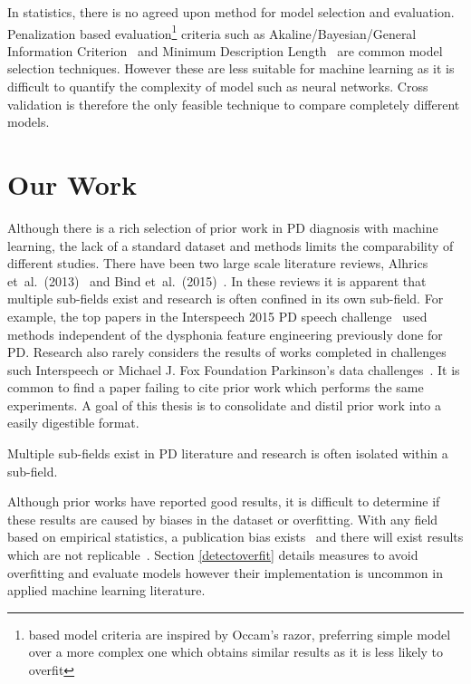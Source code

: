 \documentclass[12pt, twoside]{book}
\renewcommand\emph[1]{\textit{\color{USred}{#1}}}
\begin{document}
In statistics, there is no agreed upon method for model selection and evaluation. Penalization based evaluation\footnote{\emph{Penalization} based model criteria are inspired by Occam's razor, preferring simple model over a more complex one which obtains similar results as it is less likely to overfit}  criteria such as Akaline/Bayesian/General Information Criterion~\cite{aicbic,generalinfocriteriongic} and Minimum Description Length~\cite{mindescriptionlength} are common model selection techniques. However these are less suitable for machine learning as it is difficult to quantify the complexity of model such as neural networks. Cross validation is therefore the only feasible technique to compare completely different models. 
 







\chapter{Our Work}
\label{ourwork}
Although there is a rich selection of prior work in PD diagnosis with machine learning, the lack of a standard dataset and methods limits the comparability of different studies. There have been two large scale literature reviews, Alhrics et~al.~(2013)~\cite{review2013} and Bind et~al.~(2015)~\cite{review2015}. In these reviews it is apparent that multiple sub-fields exist and research is often confined in its own sub-field. For example, the top papers in the Interspeech 2015 PD speech challenge~\cite{compareis15pd} used methods independent of the dysphonia feature engineering previously done for PD. Research also rarely considers the results of works completed in challenges such Interspeech or Michael J. Fox Foundation Parkinson's data challenges~\cite{mjfoxchallenge2013}. It is common to find a paper failing to cite prior work which performs the same experiments. A goal of this thesis is to consolidate and distil prior work into a easily digestible format. 

\begin{highlight}
Multiple sub-fields exist in PD literature and research is often isolated within a sub-field.
\end{highlight}

Although prior works have reported good results, it is difficult to determine if these results are caused by biases in the dataset or overfitting. With any field based on empirical statistics, a publication bias exists~\cite{publicationbias} and there will exist results which are not replicable~\cite{replicability}. Section \ref{detectoverfit} details measures to avoid overfitting and evaluate models however their implementation is uncommon in applied machine learning literature. 
\end{document}
